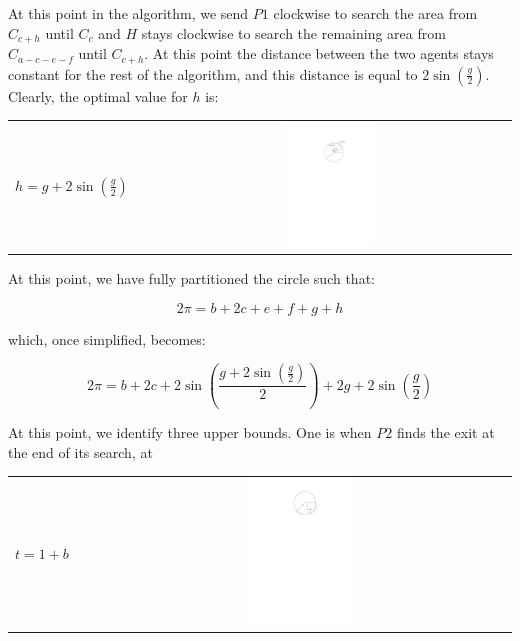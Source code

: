 \documentclass[11pt]{article}
\begin{document}
\begin{flushleft}
    At this point in the algorithm, we send $P1$ clockwise to search the area from $C_{c + h}$ until
    $C_{c}$ and $H$ stays clockwise to search the remaining area from $C_{a - c - e - f}$ until $C_{c + h}$. At this point the distance between the two agents stays constant for the rest of the algorithm, and this distance is equal to $2\sin(\frac{g}{2})$. Clearly, the optimal value for $h$ is:

    \begin{tabularx}{\textwidth}{lXc}
        \multirow{2}{*}{$h = g+2\sin(\frac{g}{2})$} & & \parbox[c]{0.25\textwidth}{\includegraphics[width=0.25\textwidth]{Q2S1_Eq/eq_6.pdf}} \\
    \end{tabularx}


    At this point, we have fully partitioned the circle such that:

    \[ 2\pi = b + 2c + e + f + g + h\]

    which, once simplified, becomes:

    \[ 2\pi = b + 2c + 2\sin(\frac{g + 2\sin(\frac{g}{2})}{2}) + 2g + 2\sin(\frac{g}{2}) \]

    At this point, we identify three upper bounds. One is when $P2$ finds the exit at the end of its
    search, at

    \begin{tabularx}{\textwidth}{lXc}
        \multirow{2}{*}{$t = 1+b$} & & \parbox[c]{0.25\textwidth}{\includegraphics[width=0.25\textwidth]{Q2S1_Eq/ub_1.pdf}} \\
    \end{tabularx}


\end{flushleft}
\end{document}
